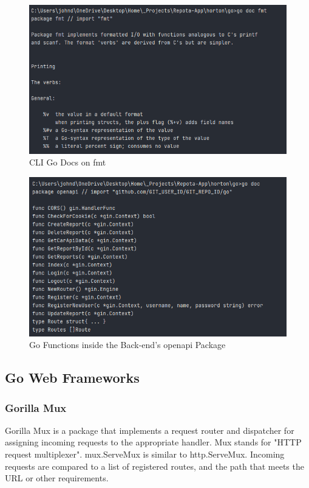 \begin{figure}[H]
    \caption{CLI Go Docs on fmt}
    \label{image:goDocFmt}
    \centering
    \includegraphics[width=1.0\textwidth]{images/misc/go-doc-fmt.png}
\end{figure}

\begin{figure}[H]
    \caption{Go Functions inside the Back-end's openapi Package}
    \label{image:goFuncs}
    \centering
    \includegraphics[width=1.0\textwidth]{images/misc/godoc-funcs.png}
\end{figure}

\subsection{Go Web Frameworks}
\subsubsection{Gorilla Mux}
Gorilla Mux is a package that implements a request router and dispatcher for assigning incoming requests to the appropriate handler. Mux stands for "HTTP request multiplexer". mux.ServeMux is similar to http.ServeMux. Incoming requests are compared to a list of registered routes, and the path that meets the URL or other requirements. \cite{ref8} 


